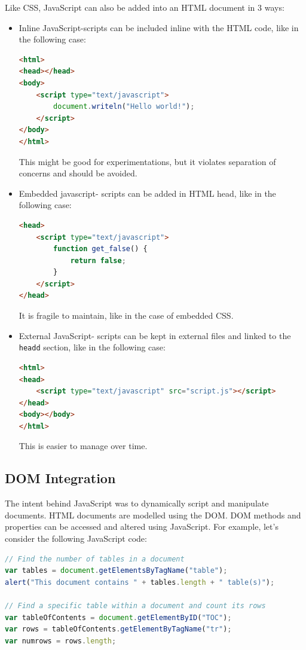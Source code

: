 \documentclass[a4paper, openany]{memoir}
\begin{document}
Like CSS, JavaScript can also be added into an HTML document in 3 ways:
\begin{itemize}
    \item Inline JavaScript-scripts can be included inline with the HTML code, like in the following case:
    \begin{lstlisting}[language=html]
<html>
<head></head>
<body>
    <script type="text/javascript">
        document.writeln("Hello world!");
    </script>
</body>
</html>\end{lstlisting}
    This might be good for experimentations, but it violates separation of concerns and should be avoided.
    
    \item Embedded javascript- scripts can be added in HTML head, like in the following case:
    \begin{lstlisting}[language=html]
<head>
    <script type="text/javascript">
        function get_false() {
            return false;
        }
    </script>
</head>\end{lstlisting}
    It is fragile to maintain, like in the case of embedded CSS.
    
    \item External JavaScript- scripts can be kept in external files and linked to the \texttt{headd} section, like in the following case:
    \begin{lstlisting}[language=html]
<html>
<head>
    <script type="text/javascript" src="script.js"></script>
</head>
<body></body>
</html>\end{lstlisting}
    This is easier to manage over time.
\end{itemize}

\subsection{DOM Integration}
The intent behind JavaScript was to dynamically script and manipulate documents. HTML documents are modelled using the DOM. DOM methods and properties can be accessed and altered using JavaScript. For example, let's consider the following JavaScript code:
\begin{lstlisting}[language=javascript]
// Find the number of tables in a document
var tables = document.getElementsByTagName("table");
alert("This document contains " + tables.length + " table(s)");

// Find a specific table within a document and count its rows
var tableOfContents = document.getElementByID("TOC");
var rows = tableOfContents.getElementByTagName("tr");
var numrows = rows.length;
\end{lstlisting}
\end{document}
